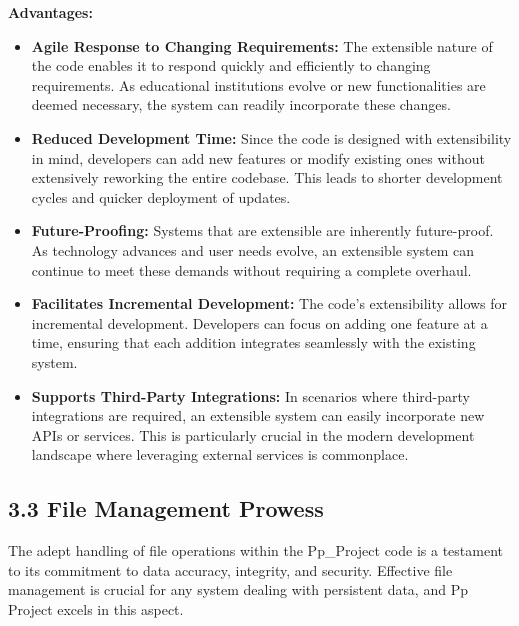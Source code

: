 \documentclass{article}
\begin{document}
\textbf{Advantages:}
\begin{itemize}
    \item \textbf{Agile Response to Changing Requirements:} The extensible nature of the code enables it to respond quickly and efficiently to changing requirements. 
    As educational institutions evolve or new functionalities are deemed necessary, the system can readily incorporate these changes.
    \item \textbf{Reduced Development Time:} Since the code is designed with extensibility in mind, 
    developers can add new features or modify existing ones without extensively reworking the entire codebase. 
    This leads to shorter development cycles and quicker deployment of updates.
    \item \textbf{Future-Proofing:} Systems that are extensible are inherently future-proof. 
    As technology advances and user needs evolve, an extensible system can continue to meet these demands without requiring a complete overhaul.
    \item \textbf{Facilitates Incremental Development:} The code's extensibility allows for incremental development. 
    Developers can focus on adding one feature at a time, ensuring that each addition integrates seamlessly with the existing system.
    \item \textbf{Supports Third-Party Integrations:} In scenarios where third-party integrations are required, 
    an extensible system can easily incorporate new APIs or services. 
    This is particularly crucial in the modern development landscape where leveraging external services is commonplace.
\end{itemize}

\subsection*{\textbf{3.3 File Management Prowess}}

The adept handling of file operations within the Pp\_Project code is a testament to its commitment to data accuracy, 
integrity, and security. Effective file management is crucial for any system dealing with persistent data, and Pp Project excels in this aspect.
\end{document}

